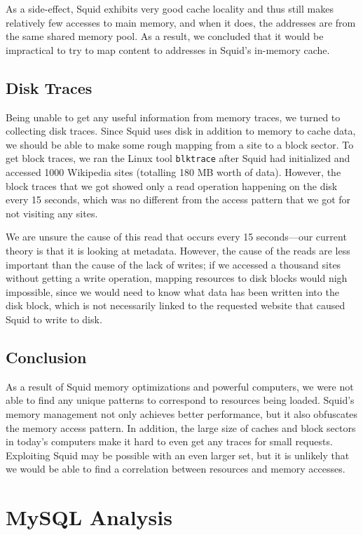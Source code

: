 \documentclass[11pt, oneside]{article}
\begin{document}
As a side-effect, Squid exhibits very good cache locality
and thus still makes relatively few accesses to main memory, and when
it does, the addresses are from the same shared memory pool. As a result,
we concluded that it would be impractical to try to map content to addresses
in Squid's in-memory cache.

\subsection{Disk Traces}

Being unable to get any useful information from memory traces, we turned to 
collecting disk traces. Since Squid uses disk in addition to memory to cache 
data, we should be able to make some rough mapping from a site to a block
sector. To get block traces, we ran the Linux tool {\tt blktrace} after
Squid had initialized and accessed 1000 Wikipedia sites (totalling 180 MB
worth of data). However, the block traces that we got showed only a read 
operation happening on the disk every 15 seconds, which was no different from 
the access pattern that we got for not visiting any sites.

We are unsure the cause of this read that occurs every 15 seconds---our 
current theory is that it is looking at metadata. However, the cause of the 
reads are less important than the cause of the lack of writes; if we
accessed a thousand sites without getting a write operation, mapping resources 
to disk blocks would nigh impossible, since we would need to know what data
has been written into the disk block, which is not necessarily linked to the
requested website that caused Squid to write to disk.

\subsection{Conclusion}

As a result of Squid memory optimizations and powerful computers, we were 
not able to find any unique patterns to correspond to resources being loaded. 
Squid's memory management not only achieves better performance, but it also 
obfuscates the memory access pattern. In addition, the large size of caches
and block sectors in today's computers make it hard to even get any traces 
for small requests. Exploiting Squid may be possible with an even larger
set, but it is unlikely that we would be able to find a correlation between
resources and memory accesses.

\section{MySQL Analysis}
\end{document}
